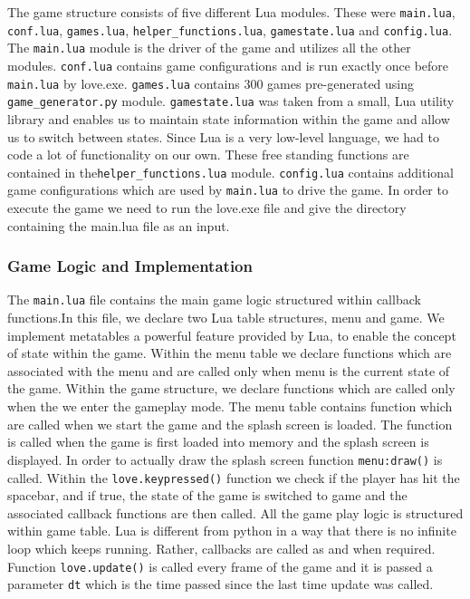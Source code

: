 	The game structure consists of five different Lua modules. These were \texttt{main.lua}, \texttt{conf.lua}, \texttt{games.lua},  \texttt{helper\_functions.lua}, \texttt{gamestate.lua} and \texttt{config.lua}. The \texttt{main.lua} module is the driver of the game and utilizes all the other modules. \texttt{conf.lua} contains game configurations and is run exactly once before \texttt{main.lua} by love.exe. \texttt{games.lua} contains 300 games pre-generated using \texttt{game\_generator.py} module. \texttt{gamestate.lua} was taken from  a small, Lua utility library and enables us to maintain state information within the game and allow us to switch between states. Since Lua is a very low-level language, we had to code a lot of functionality on our own. These free standing functions are contained in the\texttt{helper\_functions.lua} module. \texttt{config.lua} contains additional game configurations which are used by \texttt{main.lua} to drive the game. In order to execute the game we need to run the love.exe file and give the directory containing the main.lua file as an input.
	\subsubsection{Game Logic and Implementation}
	
	The \texttt{main.lua} file contains the main game logic structured within callback functions.In this file, we declare two Lua table structures, menu and game. We implement metatables a powerful feature provided by Lua, to enable the concept of state within the game. Within the menu table we declare functions which are associated with the menu and are called only when menu is the current state of the game. Within the game structure, we declare functions which are called only when the we enter the gameplay mode.
	The menu table contains function which are called when we start the game and the splash screen is loaded. The function is called when the game is first loaded into memory and the splash screen is displayed. In order to actually draw the splash screen function \texttt{menu:draw()} is called. Within the \texttt{love.keypressed()} function we check if the player has hit the spacebar, and if true, the state of the game is switched to game and the associated callback functions are then called. All the game play logic is structured within game table. Lua is different from python in a way  that there is no infinite loop which keeps running. Rather, callbacks are called as and when required. Function \texttt{love.update()} is called every frame of the game and it is passed a parameter \texttt{dt} which is the time passed since the last time update was called.
	

